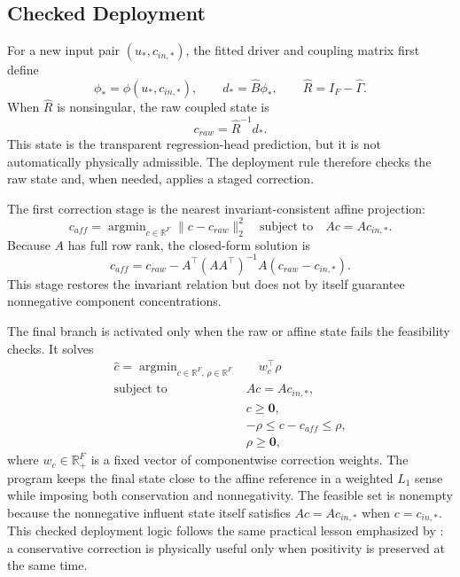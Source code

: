 \documentclass[12pt, twoside]{book}
\DeclareMathOperator*{\argmin}{argmin}
\begin{document}
\subsection{Checked Deployment}

For a new input pair \((u_*,c_{in,*})\), the fitted driver and coupling matrix first define
\begin{equation}
\label{eq:ch3_deployment_definitions}
\phi_*=\phi(u_*,c_{in,*}),\qquad
d_*=\widehat{B}\phi_*,\qquad
\widehat{R}=I_F-\widehat{\Gamma}.
\end{equation}
When \(\widehat{R}\) is nonsingular, the raw coupled state is
\begin{equation}
\label{eq:ch3_raw_coupled_state}
c_{raw}=\widehat{R}^{-1}d_*.
\end{equation}
This state is the transparent regression-head prediction, but it is not automatically physically admissible.
The deployment rule therefore checks the raw state and, when needed, applies a staged correction.

The first correction stage is the nearest invariant-consistent affine projection:
\begin{equation}
\label{eq:ch3_affine_projection}
c_{aff}
=\argmin_{c\in\mathbb{R}^{F}}\|c-c_{raw}\|_2^2
\quad\text{subject to}\quad
Ac=Ac_{in,*}.
\end{equation}
Because \(A\) has full row rank, the closed-form solution is
\begin{equation}
\label{eq:ch3_affine_closed_form}
c_{aff}=c_{raw}-A^\top(AA^\top)^{-1}A(c_{raw}-c_{in,*}).
\end{equation}
This stage restores the invariant relation but does not by itself guarantee nonnegative component
concentrations.

The final branch is activated only when the raw or affine state fails the feasibility checks. It solves
\begin{equation}
\label{eq:ch3_deployment_lp}
\begin{aligned}
\hat{c}
=\argmin_{c\in\mathbb{R}^{F},\,\rho\in\mathbb{R}^{F}}
&\quad w_c^\top\rho\\
\text{subject to}\quad
& Ac=Ac_{in,*},\\
& c\geq\mathbf{0},\\
& -\rho\leq c-c_{aff}\leq\rho,\\
& \rho\geq\mathbf{0},
\end{aligned}
\end{equation}
where \(w_c\in\mathbb{R}_{+}^{F}\) is a fixed vector of componentwise correction weights. The program keeps
the final state close to the affine reference in a weighted \(L_1\) sense while imposing both conservation and
nonnegativity. The feasible set is nonempty because the nonnegative influent state itself satisfies
\(Ac=Ac_{in,*}\) when \(c=c_{in,*}\). This checked deployment logic follows the same practical lesson emphasized by
\citet{KircherVotsmeier2025}: a conservative correction is physically useful only when positivity is
preserved at the same time.
\end{document}
